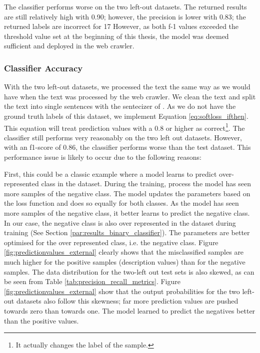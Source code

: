\documentclass[a4paper, 12pt, oneside]{book} %
\begin{document}
The classifier performs worse on the two left-out datasets. 
The returned results are still relatively high with 0.90; however, the precision is lower with 0.83; the returned labels are incorrect for 17%
However, as both f-1 values exceeded the threshold value set at the beginning of this thesis, the model was deemed sufficient and deployed in the web crawler. 

\subsubsection{Classifier Accuracy}
With the two left-out datasets, we processed the text the same way as we would have when the text was processed by the web crawler. 
We clean the text and split the text into single sentences with the sentecizer of \textcite{honnibal_spacy_2020}.
As we do not have the ground truth labels of this dataset, we implement Equation \ref{eq:softloss_ifthen}.
This equation will treat prediction values with a 0.8 or higher as correct\footnote{It actually changes the label of the sample.}.
The classifier still performs very reasonably on the two left out datasets.
However, with an f1-score of 0.86, the classifier performs worse than the test dataset.
This performance issue is likely to occur due to the following reasons:

First, this could be a classic example where a model learns to predict over-represented class in the dataset.
During the training, process the model has seen more samples of the negative class.
The model updates the parameters based on the loss function and does so equally for both classes.
As the model has seen more samples of the negative class, it better learns to predict the negative class.
In our case, the negative class is also over represented in the dataset during training (See Section \ref{par:results_binary_classifier}).
The parameters are better optimised for the over represented class, i.e. the negative class.
Figure \ref{fig:predictionvalues_external} clearly shows that the misclassified samples are much higher for the positive samples (description values) than for the negative samples. 
The data distribution for the two-left out test sets is also skewed, as can be seen from Table \ref{tab:precision_recall_metrics}.
Figure \ref{fig:predictionvalues_external} show that the output probabilities for the two left-out datasets also follow this skewness; far more prediction values are pushed towards zero than towards one.
The model learned to predict the negatives better than the positive values.
\end{document}
